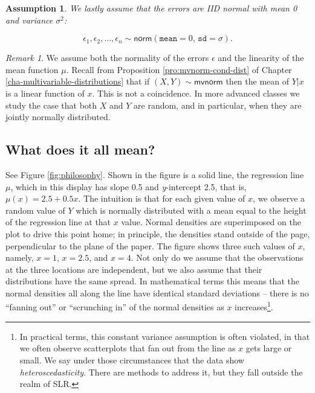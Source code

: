 \documentclass[]{book}
\let\rmarkdownfootnote\footnote%
\def\footnote{\protect\rmarkdownfootnote}
\numberwithin{equation}{chapter}
\numberwithin{figure}{chapter}
\theoremstyle{plain}
\newtheorem{assumption}[thm]{Assumption}
\theoremstyle{definition}
\theoremstyle{remark}
\newtheorem{rem}[thm]{Remark}
\theoremstyle{definition}
\theoremstyle{definition}
\theoremstyle{remark}
\begin{document}
\bigskip

\begin{assumption}
We lastly assume that the errors are IID normal with mean 0 and variance
\(\sigma^{2}\):

\begin{equation}
\epsilon_{1},\epsilon_{2},\ldots,\epsilon_{n}\sim\mathsf{norm}(\mathtt{mean}=0,\,\mathtt{sd}=\sigma).
\end{equation}
\end{assumption}

\bigskip

\begin{rem}
We assume both the normality of the errors \(\epsilon\) and the
linearity of the mean function \(\mu\). Recall from Proposition
\ref{pro:mvnorm-cond-dist} of Chapter
\ref{cha-multivariable-distributions} that if
\((X,Y) \sim \mathsf{mvnorm}\) then the mean of \(Y|x\) is a linear
function of \(x\). This is not a coincidence. In more advanced classes
we study the case that both \(X\) and \(Y\) are random, and in
particular, when they are jointly normally distributed.
\end{rem}

\subsection{What does it all mean?}\label{what-does-it-all-mean}

See Figure \ref{fig:philosophy}. Shown in the figure is a solid line,
the regression line  \(\mu\), which in this
display has slope 0.5 and \emph{y}-intercept 2.5, that is,
\(\mu(x)=2.5 + 0.5x\). The intuition is that for each given value of
\(x\), we observe a random value of \(Y\) which is normally distributed
with a mean equal to the height of the regression line at that \(x\)
value. Normal densities are superimposed on the plot to drive this point
home; in principle, the densities stand outside of the page,
perpendicular to the plane of the paper. The figure shows three such
values of \(x\), namely, \(x = 1\), \(x = 2.5\), and \(x = 4\). Not only
do we assume that the observations at the three locations are
independent, but we also assume that their distributions have the same
spread. In mathematical terms this means that the normal densities all
along the line have identical standard deviations -- there is no
``fanning out'' or ``scrunching in'' of the normal densities as \(x\)
increases\footnote{In practical terms, this constant variance assumption
  is often violated, in that we often observe scatterplots that fan out
  from the line as \(x\) gets large or small. We say under those
  circumstances that the data show \emph{heteroscedasticity}. There are
  methods to address it, but they fall outside the realm of SLR.}.
\end{document}
